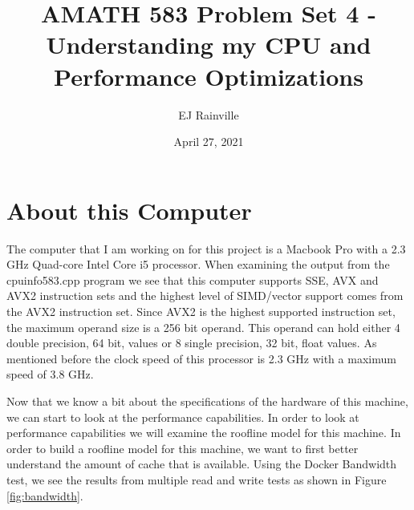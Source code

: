 \documentclass{article}
\begin{document}
\title{AMATH 583 Problem Set 4 - Understanding my CPU and Performance Optimizations}
\author{EJ Rainville}
\date{April 27, 2021}
\maketitle


\section{About this Computer}

The computer that I am working on for this project is a Macbook Pro with a 2.3 GHz Quad-core Intel Core i5 processor. When examining the output from the cpuinfo583.cpp program we see that this computer supports SSE, AVX and AVX2 instruction sets and the highest level of SIMD/vector support comes from the AVX2 instruction set. Since AVX2 is the highest supported instruction set, the maximum operand size is a 256 bit operand. This operand can hold either 4 double precision, 64 bit, values or 8 single precision, 32 bit, float values. As mentioned before the clock speed of this processor is 2.3 GHz with a maximum speed of 3.8 GHz. 

Now that we know a bit about the specifications of the hardware of this machine, we can start to look at the performance capabilities. In order to look at performance capabilities we will examine the roofline model for this machine. In order to build a roofline model for this machine, we want to first better understand the amount of cache that is available. Using the Docker Bandwidth test, we see the results from multiple read and write tests as shown in Figure \ref{fig:bandwidth}. 
\end{document}
